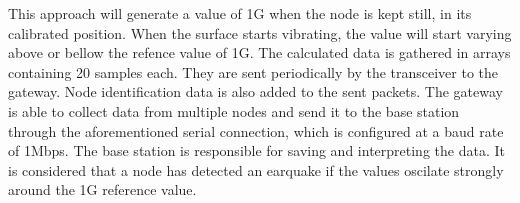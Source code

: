 This approach will generate a value of 1G when the node is kept still, in its calibrated position. When the surface starts vibrating, the value will start varying 
above or bellow the refence value of 1G. The calculated data is gathered in arrays containing 20 samples each. They are sent periodically by the transceiver to the 
gateway. Node identification data is also added to the sent packets. The gateway is able to collect data from multiple nodes and send it to the base station through
the aforementioned serial connection, which is configured at a baud rate of 1Mbps. The base station is responsible for saving and interpreting the data. 
It is considered that a node has detected an earquake if the values oscilate strongly around the 1G reference value.



